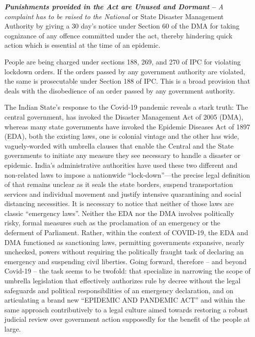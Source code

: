 \begin{multicols}{2}
\noi
\textbf{\textit{Punishments provided in the Act are Unused and Dormant} –} \textit{A complaint has to be raised to the National} or State Disaster Management Authority by giving a 30 day’s notice under
Section 60 of the DMA for taking cognizance of any offence committed under the act,
thereby hindering quick action which is essential at the time of an epidemic.


\noi
People are being charged under sections 188, 269, and 270 of IPC for violating lockdown
orders. If the orders passed by any government authority are violated, the same is
prosecutable under Section 188 of IPC. This is a broad provision that deals with the
disobedience of an order passed by any government authority.

\vspace{-.1cm}


\vspace{-.1cm}

\noi
The Indian State’s response to the Covid-19 pandemic reveals a stark truth: The central
government, has invoked the Disaster Management Act of 2005 (DMA), whereas many state
governments have invoked the Epidemic Diseases Act of 1897 (EDA), both the existing laws,
one is colonial vintage and the other has wide, vaguely-worded with umbrella clauses that
enable the Central and the State governments to initiate any measure they see necessary to
handle a disaster or epidemic. India’s administrative authorities have used these two different 
and non-related laws to impose a nationwide “lock-down”—the precise legal definition of
that remains unclear as it seals the state borders, suspend transportation services and
individual movement and justify intensive quarantining and social distancing necessities.
It is necessary to notice that neither of those laws are classic “emergency laws”. Neither the
EDA nor the DMA involves politically risky, formal measures such as the proclamation of an
emergency or the deferment of Parliament. Rather, within the context of COVID-19, the
EDA and DMA functioned as sanctioning laws, permitting governments expansive, nearly
unchecked, powers without requiring the politically fraught task of declaring an emergency
and suspending civil liberties. Going forward, therefore – and beyond Covid-19 – the task
seems to be twofold: that specialize in narrowing the scope of umbrella legislation that
effectively authorizes rule by decree without the legal safeguards and political responsibilities
of an emergency declaration, and on articulating a brand new “EPIDEMIC AND
PANDEMIC ACT” and within the same approach contributively to a legal culture aimed
towards restoring a robust judicial review over government action supposedly for the benefit
of the people at large.


\end{multicols}
